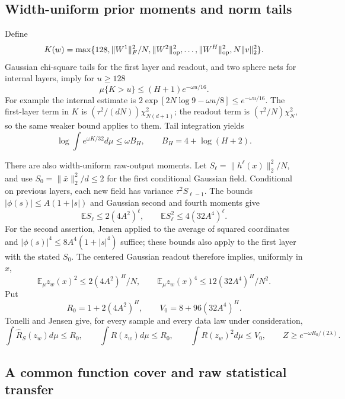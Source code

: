 \subsection{Width-uniform prior moments and norm tails}

Define
\[
 K(w)=\max\{128,\|W^1\|_F^2/N,
          \|W^2\|_{\rm op}^2,\ldots,\|W^H\|_{\rm op}^2,
          N\|v\|_2^2\}.
\]
Gaussian chi-square tails for the first layer and readout, and two
sphere nets for internal layers, imply for $u\geq128$
\begin{equation}
 \mu\{K>u\}\leq(H+1)e^{-\omega u/16}.
 \label{ag-eq:general-activation-norm-tail}
\end{equation}
For example the internal estimate is
$2\exp[2N\log9-\omega u/8]\leq e^{-\omega u/16}$.
The first-layer term in $K$ is $(\tau^2/(dN))\chi^2_{N(d+1)}$;
the readout term is $(\tau^2/N)\chi^2_N$, so the same weaker bound
applies to them.
Tail integration yields
\begin{equation}
 \log\int e^{\omega K/32}d\mu\leq\omega B_H,
 \qquad B_H=4+\log(H+2).
 \label{ag-eq:general-activation-norm-mgf}
\end{equation}

There are also width-uniform raw-output moments.  Let
$S_\ell=\|h^\ell(x)\|_2^2/N$, and use $S_0=\|\bar x\|_2^2/d\leq2$
for the first conditional Gaussian field.  Conditional on previous
layers, each new field has variance $\tau^2S_{\ell-1}$.
The bounds $|\phi(s)|\leq A(1+|s|)$ and Gaussian second and fourth
moments give
\[
 \mathbb E S_\ell\leq2(4A^2)^\ell,
 \qquad \mathbb E S_\ell^2\leq4(32A^4)^\ell.
\]
For the second assertion, Jensen applied to the average of squared
coordinates and $|\phi(s)|^4\leq8A^4(1+|s|^4)$ suffice; these bounds
also apply to the first layer with the stated $S_0$.
The centered Gaussian readout therefore implies, uniformly in $x$,
\[
 \mathbb E_\mu z_w(x)^2\leq 2(4A^2)^H/N,
 \qquad \mathbb E_\mu z_w(x)^4\leq12(32A^4)^H/N^2.
\]
Put
\[
 R_0=1+2(4A^2)^H,\qquad V_0=8+96(32A^4)^H.
\]
Tonelli and Jensen give, for every sample and every data law under
consideration,
\begin{equation}
 \int\widehat R_S(z_w)d\mu\leq R_0,\qquad
 \int R(z_w)d\mu\leq R_0,\qquad
 \int R(z_w)^2d\mu\leq V_0,
 \qquad Z\geq e^{-\omega R_0/(2\lambda)}.
 \label{ag-eq:general-activation-prior-moments}
\end{equation}

\subsection{A common function cover and raw statistical transfer}

